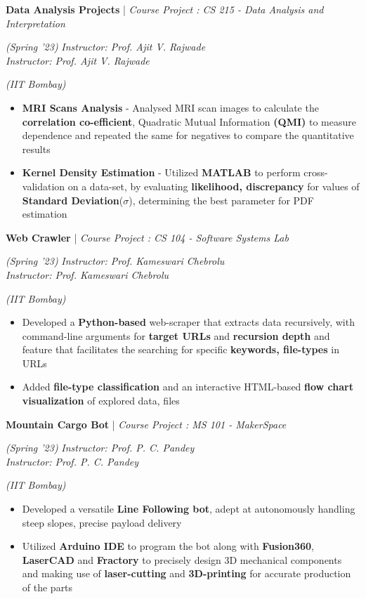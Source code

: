 \documentclass[10pt]{article}
\newcommand{\xfill}[2][1ex]{
	\dimen0=#2\advance\dimen0 by #1
	\leaders\hrule height \dimen0 depth -#1\hfill
}
\renewcommand{\section}[1]{
	\vspace{5pt}
	{\color{Blue}{\Large\scshape\raggedright #1\xfill[0pt]{0.5pt}}}
}
\renewcommand{\subsection}[4]{
	\def\temp{#4}
	\vspace{2pt}
	{
		\large
		{\textbf{#1}} | {\sl #2} \filldate{#3}
		\ifx\temp\empty
		\else
		{
			\\[0.1em]
			\fontsize{11}{13.2}\selectfont
			\sl #4
		}
		\fi
	}
}
\newcommand{\filldate}[1]{\strut\hfill {\small \textit{(#1)}}}
\begin{document}
\subsection{Data Analysis Projects}{Course Project : CS 215 - Data Analysis and Interpretation}{Spring '23}{\textit{Instructor: Prof. Ajit V. Rajwade}}\filldate{IIT Bombay}
\begin{itemize}
 	\item \textbf{MRI Scans Analysis} - Analysed MRI scan images to calculate the \textbf{correlation co-efficient}, Quadratic Mutual Information \textbf{(QMI)} to measure dependence and repeated the same for negatives to compare the quantitative results
 	\item \textbf{Kernel Density Estimation} - Utilized \textbf{MATLAB} to perform cross-validation on a data-set, by evaluating \textbf{likelihood, discrepancy} for values of \textbf{Standard Deviation}(\textbf{$\sigma$}), determining the best parameter for PDF estimation
  
\end{itemize}
\section{Other Projects}



\subsection{Web Crawler}{Course Project : CS 104 - Software Systems Lab}{Spring '23}{\textit{Instructor: Prof. Kameswari Chebrolu}}\filldate{IIT Bombay}
\begin{itemize}
	\item Developed a \textbf{Python-based} web-scraper that extracts data recursively, with command-line arguments for \textbf{target URLs} and \textbf{recursion depth} and feature that facilitates the searching for specific\textbf{ keywords, file-types} in URLs
        \item Added \textbf{file-type classification} and an interactive HTML-based \textbf{flow chart visualization} of explored data, files
\end{itemize}



\subsection{Mountain Cargo Bot}{Course Project : MS 101 - MakerSpace}{Spring '23}{\textit{Instructor: Prof. P. C. Pandey}}\filldate{IIT Bombay}
\begin{itemize}
	\item Developed a versatile \textbf{Line Following bot}, adept at autonomously handling steep slopes, precise payload delivery
        \item Utilized \textbf{Arduino IDE} to program the bot along with \textbf{Fusion360}, \textbf{LaserCAD} and \textbf{Fractory} to precisely design 3D mechanical components and making use of \textbf{laser-cutting} and \textbf{3D-printing} for accurate production of the parts
        
\end{itemize}
\end{document}
